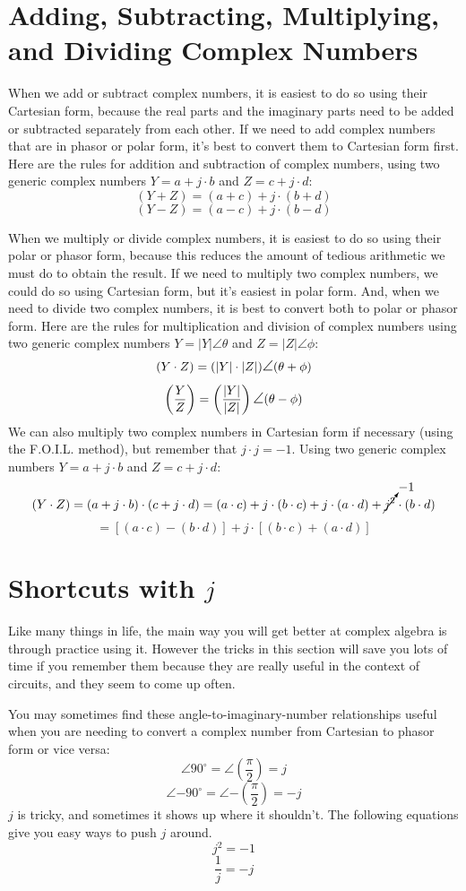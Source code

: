 \section{Adding, Subtracting, Multiplying, and Dividing Complex Numbers}
When we add or subtract complex numbers, it is easiest to do so using their Cartesian form, because the real parts and the imaginary parts need to be added or subtracted separately from each other. If we need to add complex numbers that are in phasor or polar form, it's best to convert them to Cartesian form first. Here are the rules for addition and subtraction of complex numbers, using two generic complex numbers $Y=a+j\cdot b$ and $Z=c+j\cdot d$:
$$
(Y+Z) = (a+c) + j\cdot(b+d)
$$
$$
(Y-Z) = (a-c) + j\cdot(b-d)
$$
\par
When we multiply or divide complex numbers, it is easiest to do so using their polar or phasor form, because this reduces the amount of tedious arithmetic we must do to obtain the result. If we need to multiply two complex numbers, we could do so using Cartesian form, but it's easiest in polar form. And, when we need to divide two complex numbers, it is best to convert both to polar or phasor form. Here are the rules for multiplication and division of complex numbers using two generic complex numbers $Y = |Y|\angle\theta$ and $Z = |Z|\angle\phi$:
$$
(Y\cdot Z) = (|Y|\cdot|Z|)\mathlarger{\angle}(\theta+\phi)
$$
$$
\left(\frac{Y}{Z}\right) = \left(\frac{|Y|}{|Z|}\right)\mathlarger{\angle}(\theta-\phi)
$$
We can also multiply two complex numbers in Cartesian form if necessary (using the F.O.I.L. method), but remember that $j\cdot j=-1$. Using two generic complex numbers $Y=a+j\cdot b$ and $Z=c+j\cdot d$:
$$
(Y\cdot Z) = (a+j\cdot b)\cdot(c+j\cdot d) = (a\cdot c) + j\cdot (b\cdot c) + j\cdot(a\cdot d) + \cancelto{-1}{j^2}\cdot (b\cdot d) 
$$
$$
= [(a\cdot c) - (b\cdot d)] + j\cdot[(b\cdot c) + (a\cdot d)]
$$
\section{Shortcuts with $j$}
Like many things in life, the main way you will get better at complex algebra is through practice using it. However the tricks in this section will save you lots of time if you remember them because they are really useful in the context of circuits, and they seem to come up often.
\par
You may sometimes find these angle-to-imaginary-number relationships useful when you are needing to convert a complex number from Cartesian to phasor form or vice versa:
$$
\angle{90^{\circ}} = \angle\left(\frac{\pi}{2}\right) = j
$$
$$
\angle{-90^{\circ}} = \angle{-\left(\frac{\pi}{2}\right)} = -j
$$
$j$ is tricky, and sometimes it shows up where it shouldn't. The following equations give you easy ways to push $j$ around.
$$
j^2 = -1
$$
$$
\frac{1}{j} = -j
$$
